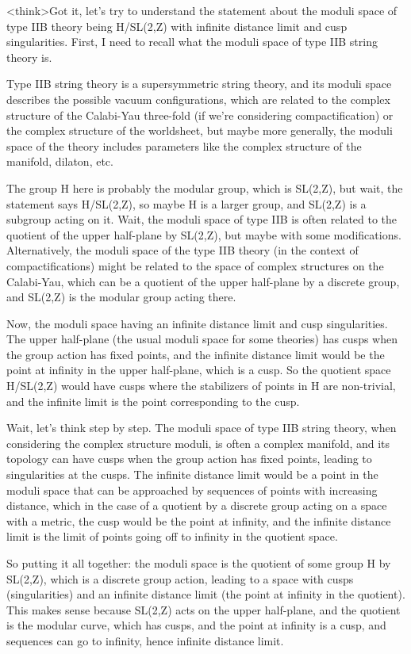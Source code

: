 <think>Got it, let's try to understand the statement about the moduli space of type IIB theory being H/SL(2,Z) with infinite distance limit and cusp singularities. First, I need to recall what the moduli space of type IIB string theory is. 

Type IIB string theory is a supersymmetric string theory, and its moduli space describes the possible vacuum configurations, which are related to the complex structure of the Calabi-Yau three-fold (if we're considering compactification) or the complex structure of the worldsheet, but maybe more generally, the moduli space of the theory includes parameters like the complex structure of the manifold, dilaton, etc. 

The group H here is probably the modular group, which is SL(2,Z), but wait, the statement says H/SL(2,Z), so maybe H is a larger group, and SL(2,Z) is a subgroup acting on it. Wait, the moduli space of type IIB is often related to the quotient of the upper half-plane by SL(2,Z), but maybe with some modifications. Alternatively, the moduli space of the type IIB theory (in the context of compactifications) might be related to the space of complex structures on the Calabi-Yau, which can be a quotient of the upper half-plane by a discrete group, and SL(2,Z) is the modular group acting there. 

Now, the moduli space having an infinite distance limit and cusp singularities. The upper half-plane (the usual moduli space for some theories) has cusps when the group action has fixed points, and the infinite distance limit would be the point at infinity in the upper half-plane, which is a cusp. So the quotient space H/SL(2,Z) would have cusps where the stabilizers of points in H are non-trivial, and the infinite limit is the point corresponding to the cusp. 

Wait, let's think step by step. The moduli space of type IIB string theory, when considering the complex structure moduli, is often a complex manifold, and its topology can have cusps when the group action has fixed points, leading to singularities at the cusps. The infinite distance limit would be a point in the moduli space that can be approached by sequences of points with increasing distance, which in the case of a quotient by a discrete group acting on a space with a metric, the cusp would be the point at infinity, and the infinite distance limit is the limit of points going off to infinity in the quotient space. 

So putting it all together: the moduli space is the quotient of some group H by SL(2,Z), which is a discrete group action, leading to a space with cusps (singularities) and an infinite distance limit (the point at infinity in the quotient). This makes sense because SL(2,Z) acts on the upper half-plane, and the quotient is the modular curve, which has cusps, and the point at infinity is a cusp, and sequences can go to infinity, hence infinite distance limit. 

